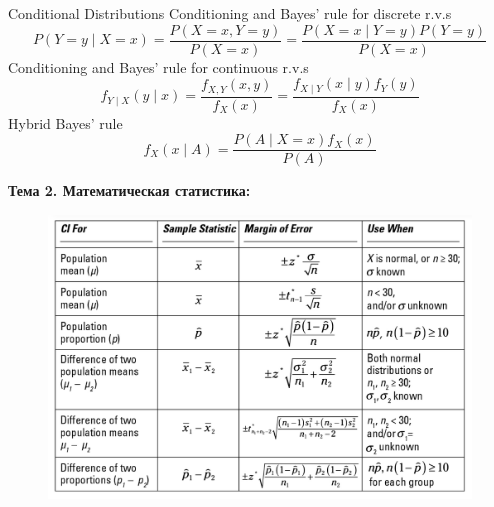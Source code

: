 \documentclass[a4paper,8pt]{article} %
\begin{document}
Conditional Distributions
Conditioning and Bayes' rule for discrete r.v.s
$$
P(Y=y \mid X=x)=\frac{P(X=x, Y=y)}{P(X=x)}=\frac{P(X=x \mid Y=y) P(Y=y)}{P(X=x)}
$$
Conditioning and Bayes' rule for continuous r.v.s
$$
f_{Y \mid X}(y \mid x)=\frac{f_{X, Y}(x, y)}{f_{X}(x)}=\frac{f_{X \mid Y}(x \mid y) f_{Y}(y)}{f_{X}(x)}
$$
Hybrid Bayes' rule
$$
f_{X}(x \mid A)=\frac{P(A \mid X=x) f_{X}(x)}{P(A)}
$$

\newpage

\textbf{Тема 2. Математическая
статистика:}

\begin{figure}[H]
\centering
\includegraphics[width=0.7\linewidth]{screenshot002}
\label{fig:screenshot002}
\end{figure}
\end{document}
